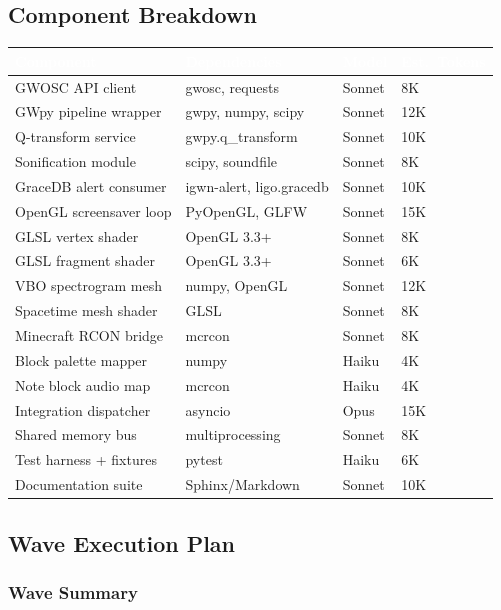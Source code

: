 \documentclass[11pt,letterpaper]{article}
\newcommand{\tableheader}[1]{\textbf{\sffamily\textcolor{white}{#1}}}
\begin{document}
\subsection{Component Breakdown}

\begin{center}
\begin{tabularx}{\textwidth}{L{3.5cm}L{2.5cm}C{1.5cm}C{2cm}}
\toprule
{}
\tableheader{Component} & \tableheader{Dependencies} & \tableheader{Model} & \tableheader{Est.\ Tokens} \\
\midrule
GWOSC API client & gwosc, requests & Sonnet & 8K \\
GWpy pipeline wrapper & gwpy, numpy, scipy & Sonnet & 12K \\
Q-transform service & gwpy.q\_transform & Sonnet & 10K \\
Sonification module & scipy, soundfile & Sonnet & 8K \\
GraceDB alert consumer & igwn-alert, ligo.gracedb & Sonnet & 10K \\
OpenGL screensaver loop & PyOpenGL, GLFW & Sonnet & 15K \\
GLSL vertex shader & OpenGL 3.3+ & Sonnet & 8K \\
GLSL fragment shader & OpenGL 3.3+ & Sonnet & 6K \\
VBO spectrogram mesh & numpy, OpenGL & Sonnet & 12K \\
Spacetime mesh shader & GLSL & Sonnet & 8K \\
Minecraft RCON bridge & mcrcon & Sonnet & 8K \\
Block palette mapper & numpy & Haiku & 4K \\
Note block audio map & mcrcon & Haiku & 4K \\
Integration dispatcher & asyncio & Opus & 15K \\
Shared memory bus & multiprocessing & Sonnet & 8K \\
Test harness + fixtures & pytest & Haiku & 6K \\
Documentation suite & Sphinx/Markdown & Sonnet & 10K \\
\bottomrule
\end{tabularx}
\end{center}

\subsection{Wave Execution Plan}

\subsubsection{Wave Summary}
\end{document}
